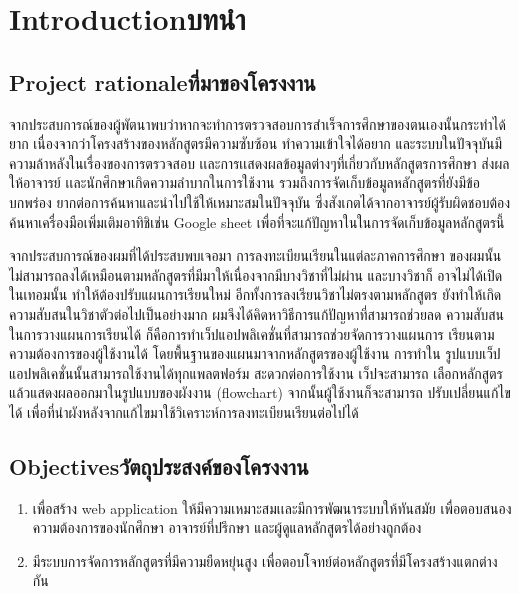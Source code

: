 \chapter{\ifenglish Introduction\else บทนำ\fi}

\section{\ifenglish Project rationale\else ที่มาของโครงงาน\fi}
{จากประสบการณ์ของผู้พัตนาพบว่าหากจะทำการตรวจสอบการสำเร็จการศึกษาของตนเองนั้นกระทำได้ยาก เนื่องจากว่าโครงสร้างของหลักสูตรมีความซับซ้อน ทำความเข้าใจได้อยาก และระบบในปัจจุบันมีความล้าหลังในเรื่องของการตรวจสอบ เเละการเเสดงผลข้อมูลต่างๆที่เกี่ยวกับหลักสูตรการศึกษา ส่งผลให้อาจารย์ เเละนักศึกษาเกิดความลําบากในการใช้งาน รวมถึงการจัดเก็บข้อมูลหลักสูตรที่ยังมีข้อบกพร่อง ยากต่อการค้นหาและนําไปใช้ให้เหมาะสมในปัจจุบัน ซึ่งสังเกตได้จากอาจารย์ผู้รับผิดชอบต้องค้นหาเครื่องมือเพิ่มเติมอาทิชิเช่น Google sheet เพื่อที่จะแก้ปัญหาในในการจัดเก็บข้อมูลหลักสูตรนี้ }


จากประสบการณ์ของผมที่ได้ประสบพบเจอมา การลงทะเบียนเรียนในแต่ละภาคการศึกษา
ของผมนั้นไม่สามารถลงได้เหมือนตามหลักสูตรที่มีมาให้เนื่องจากมีบางวิชาที่ไม่ผ่าน และบางวิชาก็
อาจไม่ได้เปิดในเทอมนั้น ทำให้ต้องปรับแผนการเรียนใหม่ อีกทั้งการลงเรียนวิชาไม่ตรงตามหลักสูตร
ยังทำให้เกิดความสับสนในวิชาตัวต่อไปเป็นอย่างมาก ผมจึงได้คิดหาวิธีการแก้ปัญหาที่สามารถช่วยลด
ความสับสนในการวางแผนการเรียนได้ ก็คือการทำเว็ปแอปพลิเคชั่นที่สามารถช่วยจัดการวางแผนการ
เรียนตามความต้องการของผู้ใช้งานได้ โดยพื้นฐานของแผนมาจากหลักสูตรของผู้ใช้งาน การทำใน
รูปแบบเว็ปแอปพลิเคชั่นนั้นสามารถใช้งานได้ทุกแพลตฟอร์ม สะดวกต่อการใช้งาน เว็ปจะสามารถ
เลือกหลักสูตรแล้วแสดงผลออกมาในรูปแบบของผังงาน (flowchart) จากนั้นผู้ใช้งานก็จะสามารถ
ปรับเปลี่ยนแก้ไขได้ เพื่อที่นำผังหลังจากแก้ไขมาใช้วิเคราะห์การลงทะเบียนเรียนต่อไปได้

\section{\ifenglish Objectives\else วัตถุประสงค์ของโครงงาน\fi}
\begin{enumerate}
    \item เพื่อสร้าง web application ให้มีความเหมาะสมเเละมีการพัฒนาระบบให้ทันสมัย เพื่อตอบสนองความต้องการของนักศึกษา อาจารย์ที่ปรึกษา และผู้ดูแลหลักสูตรได้อย่างถูกต้อง
    \item มีระบบการจัดการหลักสูตรที่มีความยืดหยุ่นสูง เพื่อตอบโจทย์ต่อหลักสูตรที่มีโครงสร้างแตกต่างกัน
\end{enumerate}

